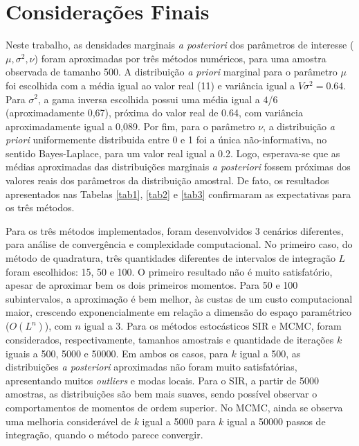 \section{Considerações Finais}\label{consfin}


Neste trabalho, as densidades marginais \textit{a posteriori} dos parâmetros de interesse ($\mu, \sigma^2, \nu$) foram aproximadas por três métodos numéricos, para uma amostra observada de tamanho 500. A distribuição \textit{a priori} marginal para o parâmetro $\mu$ foi escolhida com a média igual ao valor real (11) e variância igual a $V\sigma^2 = 0.64$. Para $\sigma^2$, a gama inversa escolhida possui uma média igual a $4$/$6$ (aproximadamente 0,67), próxima do valor real de 0.64, com variância aproximadamente igual a 0,089. Por fim, para o parâmetro $\nu$, a distribuição \textit{a priori} uniformemente distribuida entre 0 e 1 foi a única não-informativa, no sentido Bayes-Laplace, para um valor real igual a 0.2. Logo, esperava-se que as médias aproximadas das distribuições marginais \textit{a posteriori} fossem próximas dos valores reais dos parâmetros da distribuição amostral. De fato, os resultados apresentados nas Tabelas \ref{tab1}, \ref{tab2} e \ref{tab3} confirmaram as expectativas para os três métodos.

Para os três métodos implementados, foram desenvolvidos 3 cenários diferentes, para análise de convergência e complexidade computacional. No primeiro caso, do método de quadratura, três quantidades diferentes de intervalos de integração $L$ foram escolhidos: 15, 50 e 100. O primeiro resultado não é muito satisfatório, apesar de aproximar bem os dois primeiros momentos. Para 50 e 100 subintervalos, a aproximação é bem melhor, às custas de um custo computacional maior, crescendo exponencialmente em relação a dimensão do espaço paramétrico ($O(L^n)$), com $n$ igual a 3. Para os métodos estocásticos SIR e MCMC, foram considerados, respectivamente, tamanhos amostrais e quantidade de iterações $k$ iguais a 500, 5000 e 50000. Em ambos os casos, para $k$ igual a 500, as distribuições \textit{a posteriori} aproximadas não foram muito satisfatórias, apresentando muitos \textit{outliers} e modas locais. Para o SIR, a partir de 5000 amostras, as distribuições são bem mais suaves, sendo possível observar o comportamentos de momentos de ordem superior. No MCMC, ainda se observa uma melhoria considerável de $k$ igual a 5000 para $k$ igual a 50000 passos de integração, quando o método parece convergir.

